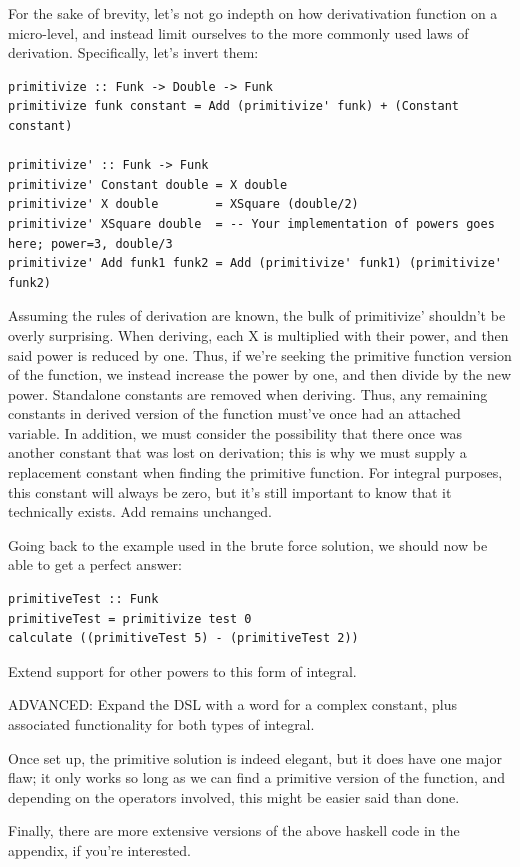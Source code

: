 For the sake of brevity, let's not go indepth on how derivativation function on a micro-level, and instead limit ourselves to the more commonly used laws of derivation. Specifically, let's invert them:

\begin{verbatim}
primitivize :: Funk -> Double -> Funk
primitivize funk constant = Add (primitivize' funk) + (Constant constant)

primitivize' :: Funk -> Funk
primitivize' Constant double = X double
primitivize' X double        = XSquare (double/2)
primitivize' XSquare double  = -- Your implementation of powers goes here; power=3, double/3
primitivize' Add funk1 funk2 = Add (primitivize' funk1) (primitivize' funk2)
\end{verbatim}

Assuming the rules of derivation are known, the bulk of primitivize' shouldn't be overly surprising.
When deriving, each X is multiplied with their power, and then said power is reduced by one. Thus, if we're seeking the primitive function version of the function, we instead increase the power by one, and then divide by the new power.
Standalone constants are removed when deriving. Thus, any remaining constants in derived version of the function must've once had an attached variable.
In addition, we must consider the possibility that there once was another constant that was lost on derivation; this is why we must supply a replacement constant when finding the primitive function. For integral purposes, this constant will always be zero, but it's still important to know that it technically exists.
Add remains unchanged.

Going back to the example used in the brute force solution, we should now be able to get a perfect answer:
\begin{verbatim}
primitiveTest :: Funk
primitiveTest = primitivize test 0
calculate ((primitiveTest 5) - (primitiveTest 2))
\end{verbatim}

\begin{exercise}
Extend support for other powers to this form of integral.
\end{exercise}
\begin{exercise}
ADVANCED: Expand the DSL with a word for a complex constant, plus associated functionality for both types of integral.
\end{exercise}

Once set up, the primitive solution is indeed elegant, but it does have one major flaw; it only works so long as we can find a primitive version of the function, and depending on the operators involved, this might be easier said than done.

Finally, there are more extensive versions of the above haskell code in the appendix, if you're interested.